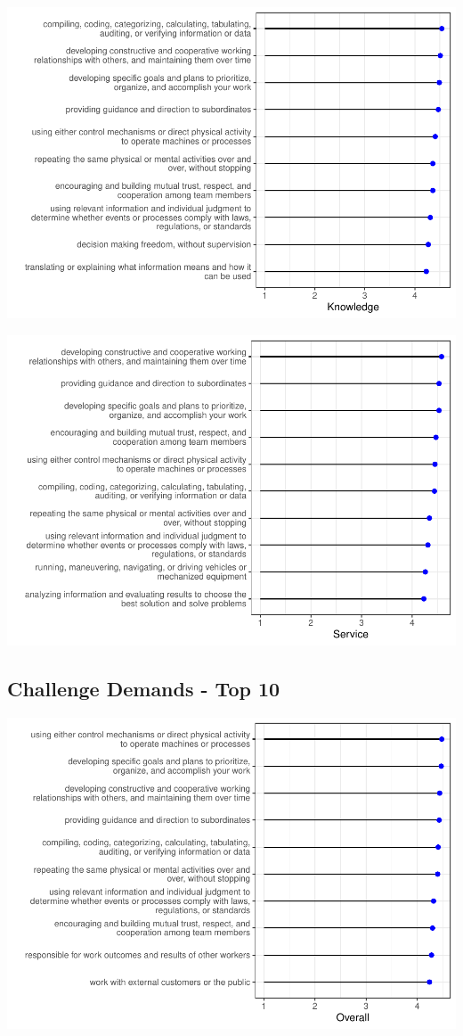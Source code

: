 \documentclass[
  english,
  man]{apa6}
\begin{document}
\includegraphics{SIOPjdr2_files/figure-latex/unnamed-chunk-2-1.pdf}

\includegraphics{SIOPjdr2_files/figure-latex/unnamed-chunk-3-1.pdf}

\hypertarget{challenge-demands---top-10}{%
\subsection{Challenge Demands - Top 10}\label{challenge-demands---top-10}}

\includegraphics{SIOPjdr2_files/figure-latex/unnamed-chunk-4-1.pdf}
\end{document}
